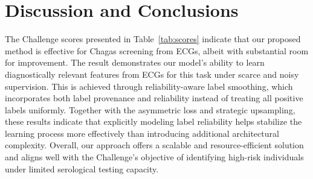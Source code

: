\section{Discussion and Conclusions}
\label{sec:discu}


The Challenge scores presented in Table~\ref{tab:scores} indicate that our proposed method is effective for Chagas screening from ECGs, albeit with substantial room for improvement. The result demonstrates our model's ability to learn diagnostically relevant features from ECGs for this task under scarce and noisy supervision. This is achieved through reliability-aware label smoothing, which incorporates both label provenance and reliability instead of treating all positive labels uniformly. Together with the asymmetric loss and strategic upsampling, these results indicate that explicitly modeling label reliability helps stabilize the learning process more effectively than introducing additional architectural complexity. Overall, our approach offers a scalable and resource-efficient solution and aligns well with the Challenge's objective of identifying high-risk individuals under limited serological testing capacity.


